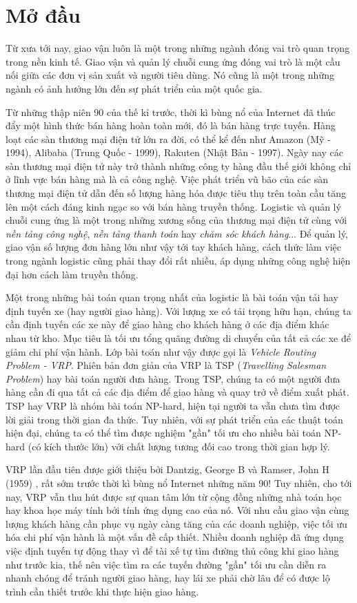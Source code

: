 \chapter{Mở đầu}
\label{chap:introduction}

Từ xưa tới nay, giao vận luôn là một trong những ngành đóng vai trò quan trọng trong nền kinh tế. Giao vận và quản lý chuỗi cung ứng đóng vai trò là một cầu nối giữa các đơn vị sản xuất và người tiêu dùng. Nó cũng là một trong những ngành có ảnh hưởng lớn đến sự phát triển của một quốc gia. 

Từ những thập niên 90 của thế kỉ trước, thời kì bùng nổ của Internet đã thúc đẩy một hình thức bán hàng hoàn toàn mới, đó là bán hàng trực tuyến. Hàng loạt các sàn thương mại điện tử lớn ra đời, có thể kể đến như Amazon (Mỹ - 1994), Alibaba (Trung Quốc - 1999), Rakuten (Nhật Bản - 1997). Ngày nay các sàn thương mại điện tử này trở thành những công ty hàng đầu thế giới không chỉ ở lĩnh vực bán hàng mà là cả công nghệ. Việc phát triển vũ bão của các sàn thương mại điện tử dẫn đến số lượng hàng hóa được tiêu thụ trên toàn cầu tăng lên một cách đáng kinh ngạc so với bán hàng truyền thống. Logistic và quản lý chuỗi cung ứng là một trong những xương sống của thương mại điện tử cùng với \textit{nền tảng công nghệ}, \textit{nền tảng thanh toán} hay \textit{chăm sóc khách hàng}... Để quản lý, giao vận số lượng đơn hàng lớn như vậy tới tay khách hàng, cách thức làm việc trong ngành logistic cũng phải thay đổi rất nhiều, áp dụng những công nghệ hiện đại hơn cách làm truyền thống.

Một trong những bài toán quan trọng nhất của logistic là bài toán vận tải hay định tuyến xe (hay người giao hàng). Với lượng xe có tải trọng hữu hạn, chúng ta cần định tuyến các xe này để giao hàng cho khách hàng ở các địa điểm khác nhau từ kho. Mục tiêu là tối ưu tổng quãng đường di chuyển của tất cả các xe để giảm chi phí vận hành. Lớp bài toán như vậy được gọi là \textit{Vehicle Routing Problem - VRP}. Phiên bản đơn giản của VRP là TSP (\textit{Travelling Salesman Problem}) hay bài toán người đưa hàng. Trong TSP, chúng ta có một người đưa hàng cần đi qua tất cả các địa điểm để giao hàng và quay trở về điểm xuất phát. TSP hay VRP là nhóm bài toán NP-hard, hiện tại người ta vẫn chưa tìm được lời giải trong thời gian đa thức. Tuy nhiên, với sự phát triển của các thuật toán hiện đại, chúng ta có thể tìm được nghiệm "gần" tối ưu cho nhiều bài toán NP-hard (có kích thước lớn) với chất lượng tương đối cao trong thời gian hợp lý.

VRP lần đầu tiên được giới thiệu bởi Dantzig, George B và Ramser, John H (1959) \cite{dantzig1959truck}, rất sớm trước thời kì bùng nổ Internet những năm 90! Tuy nhiên, cho tới nay, VRP vẫn thu hút được sự quan tâm lớn từ cộng đồng những nhà toán học hay khoa học máy tính bởi tính ứng dụng cao của nó. Với nhu cầu giao vận cùng lượng khách hàng cần phục vụ ngày càng tăng của các doanh nghiệp, việc tối ưu hóa chi phí vận hành là một vấn đề cấp thiết. Nhiều doanh nghiệp đã ứng dụng việc định tuyến tự động thay vì để tài xế tự tìm đường thủ công khi giao hàng như trước kia, thế nên việc tìm ra các tuyến đường "gần" tối ưu cần diễn ra nhanh chóng để tránh người giao hàng, hay lái xe phải chờ lâu để có được lộ trình cần thiết trước khi thực hiện giao hàng. 

